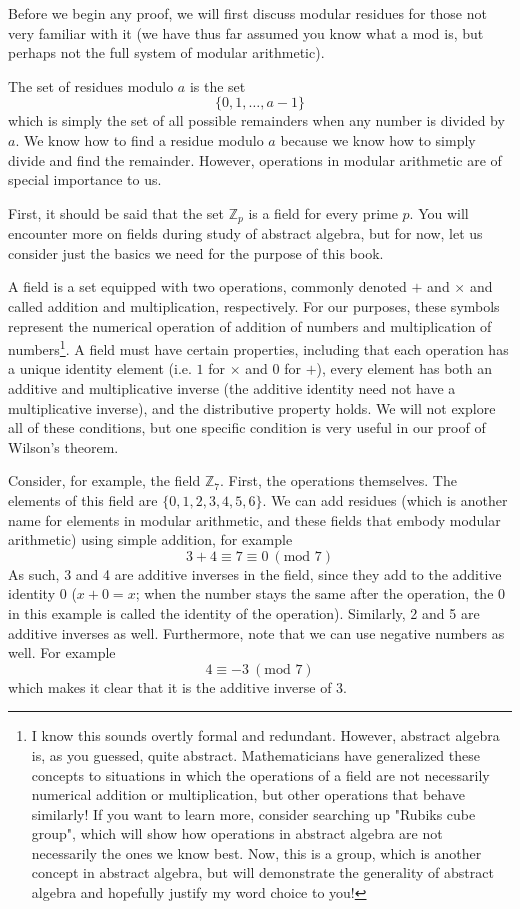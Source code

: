 Before we begin any proof, we will first discuss modular residues for those not very familiar with it (we have thus far assumed you know what a mod is, but perhaps not the full system of modular arithmetic). 

The set of residues modulo $a$ is the set
\[
\{0, 1, \ldots, a-1 \}
\]
which is simply the set of all possible remainders when any number is divided by $a$. We know how to find a residue modulo $a$ because we know how to simply divide and find the remainder. However, operations in modular arithmetic are of special importance to us. 

First, it should be said that the set $\mathbb{Z}_{p}$ is a field for every prime $p$. You will encounter more on fields during study of abstract algebra, but for now, let us consider just the basics we need for the purpose of this book. 

A field is a set equipped with two operations, commonly denoted $+$ and $\times$ and called addition and multiplication, respectively. For our purposes, these symbols represent the numerical operation of addition of numbers and multiplication of numbers\footnote{I know this sounds overtly formal and redundant. However, abstract algebra is, as you guessed, quite abstract. Mathematicians have generalized these concepts to situations in which the operations of a field are not necessarily numerical addition or multiplication, but other operations that behave similarly! If you want to learn more, consider searching up "Rubiks cube group", which will show how operations in abstract algebra are not necessarily the ones we know best. Now, this is a group, which is another concept in abstract algebra, but will demonstrate the generality of abstract algebra and hopefully justify my word choice to you!}. A field must have certain properties, including that each operation has a unique identity element (i.e. $1$ for $\times$ and $0$ for $+$), every element has both an additive and multiplicative inverse (the additive identity need not have a multiplicative inverse), and the distributive property holds. We will not explore all of these conditions, but one specific condition is very useful in our proof of Wilson's theorem. 

Consider, for example, the field $\mathbb{Z}_7$. First, the operations themselves. The elements of this field are $\{0, 1, 2, 3, 4, 5, 6\}$. We can add residues (which is another name for elements in modular arithmetic, and these fields that embody modular arithmetic) using simple addition, for example
\[
3 + 4 \equiv 7 \equiv 0 ~ (\text{mod }7)
\]
As such, 3 and 4 are additive inverses in the field, since they add to the additive identity 0 ($x + 0 = x$; when the number stays the same after the operation, the 0 in this example is called the identity of the operation). Similarly, 2 and 5 are additive inverses as well. Furthermore, note that we can use negative numbers as well. For example
\[
4 \equiv -3 ~ (\text{mod }7)
\]
which makes it clear that it is the additive inverse of $3$.

